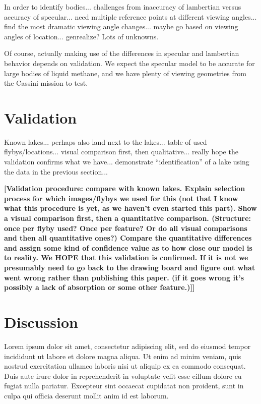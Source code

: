 \documentclass{article}
\begin{document}
\color{Green}In order to identify bodies... challenges from inaccuracy of lambertian versus accuracy of specular... need multiple reference points at different viewing angles... find the most dramatic viewing angle changes... maybe go based on viewing angles of location... genrealize? Lots of unknowns. \color{black}

Of course, actually making use of the differences in specular and lambertian behavior depends on validation. We expect the specular model to be accurate for large bodies of liquid methane, and we have plenty of viewing geometries from the Cassini mission to test.

\section{Validation}
\color{Green}Known lakes... perhaps also land next to the lakes... table of used flybys/locations... visual comparison first, then qualitative... really hope the validation confirms what we have... demonstrate ``identification'' of a lake using the data in the previous section... \color{black}

\textbf{\color{red}[Validation procedure: compare with known lakes. Explain selection process for which images/flybys we used for this (not that I know what this procedure is yet, as we haven't even started this part). Show a visual comparison first, then a quantitative comparison. (Structure: once per flyby used? Once per feature? Or do all visual comparisons and then all quantitative ones?) Compare the quantitative differences and assign some kind of confidence value as to how close our model is to reality. We HOPE that this validation is confirmed. If it is not we presumably need to go back to the drawing board and figure out what went wrong rather than publishing this paper. (if it goes wrong it's possibly a lack of absorption or some other feature.)]]\color{black}}

\section{Discussion}
Lorem ipsum dolor sit amet, consectetur adipiscing elit, sed do eiusmod tempor incididunt ut labore et dolore magna aliqua. Ut enim ad minim veniam, quis nostrud exercitation ullamco laboris nisi ut aliquip ex ea commodo consequat. Duis aute irure dolor in reprehenderit in voluptate velit esse cillum dolore eu fugiat nulla pariatur. Excepteur sint occaecat cupidatat non proident, sunt in culpa qui officia deserunt mollit anim id est laborum.
\end{document}
